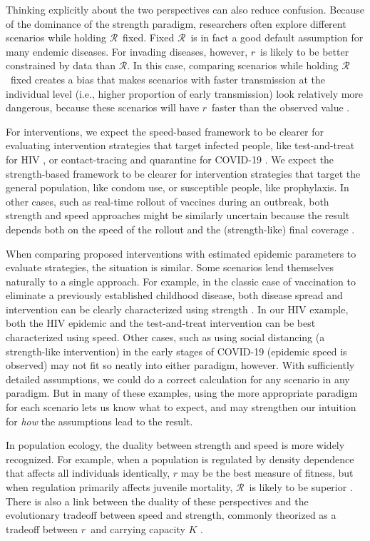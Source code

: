 \documentclass[12pt]{article}
\newcommand{\RR}{\ensuremath{{\mathcal R}}}
\newcommand{\rr}{\ensuremath{{r}}}
\begin{document}
Thinking explicitly about the two perspectives can also reduce confusion. Because of the dominance of the strength paradigm, researchers often explore different scenarios while holding \RR\ fixed. Fixed \RR\ is in fact a good default assumption for many endemic diseases. For invading diseases, however, \rr\ is likely to be better constrained by data than \RR. In this case, comparing scenarios while holding \RR\ fixed creates a bias that makes scenarios with faster transmission at the individual level (i.e., higher proportion of early transmission) look relatively more dangerous, because these scenarios will have \rr\ faster than the observed value \citep{eaton2014proportion, powers2014impact, park2019practical}.

For interventions, we expect the speed-based framework to be clearer for evaluating intervention strategies that target infected people, like test-and-treat for HIV \citep{granich2009universal}, or contact-tracing and quarantine for COVID-19 \citep{hellewell2020feasibility}. 
We expect the strength-based framework to be clearer for intervention strategies that target the general population, like condom use, or susceptible people, like prophylaxis.
In other cases, such as real-time rollout of vaccines during an outbreak, both strength and speed approaches might be similarly uncertain because the result depends both on the speed of the rollout and the (strength-like) final coverage \citep{shah2018mumps}.

When comparing proposed interventions with estimated epidemic parameters to evaluate strategies, the situation is similar. Some scenarios lend themselves naturally to a single approach. For example, in the classic case of vaccination to eliminate a previously established childhood disease, both disease spread and intervention can be clearly characterized using strength \citep{anderson1985vaccination}. In our HIV example, both the HIV epidemic and the test-and-treat intervention can be best characterized using speed. Other cases, such as using social distancing (a strength-like intervention) in the early stages of COVID-19 (epidemic speed is observed) may not fit so neatly into either paradigm, however.
With sufficiently detailed assumptions, we could do a correct calculation for any scenario in any paradigm. 
But in many of these examples, using the more appropriate paradigm for each scenario lets us know what to expect, and may strengthen our intuition for \emph{how} the assumptions lead to the result.

In population ecology, the duality between strength and speed is more widely recognized.
For example, when a population is regulated by density dependence that affects all individuals identically, $r$ may be the best measure of fitness, 
but when regulation primarily affects juvenile mortality, \RR\ is likely to be superior \citep{mylius1995evolutionarily,pasztor1996r0}.
There is also a link between the duality of these perspectives and the evolutionary tradeoff between speed and strength, commonly theorized as a tradeoff between \rr\ and carrying capacity $K$ \cite{Pianka70}.
\end{document}
